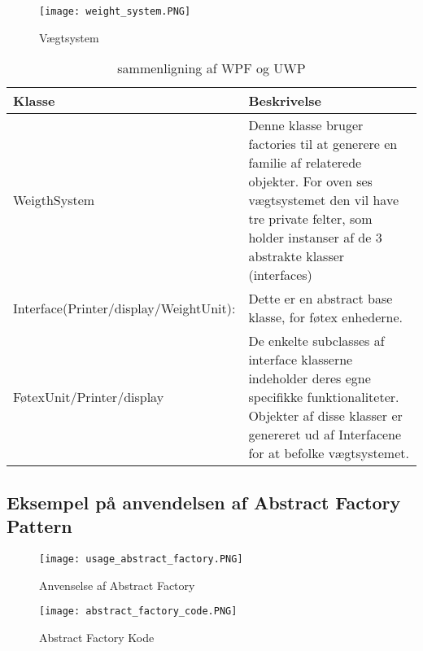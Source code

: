 \documentclass[../SWD_disp.tex]{subfiles}
\begin{document}
\begin{figure}[H]
    \centering
    \texttt{[image: weight\_system.PNG]}
    \caption{Vægtsystem}
    \label{fig:weight_system}
\end{figure}


\begin{table}[H]
    \centering
    \begin{tabular}{l|p{}}
        Klasse          & Beskrivelse        \\ \toprule
        WeigthSystem                & Denne klasse bruger factories til at generere en familie af relaterede objekter. For oven ses vægtsystemet den vil have tre private felter, som holder instanser af de 3 abstrakte klasser (interfaces)    \\ \midrule
        Interface(Printer/display/WeightUnit): & Dette er en abstract base klasse, for føtex enhederne.          \\ \midrule
        FøtexUnit/Printer/display    & De enkelte subclasses af interface klasserne indeholder deres egne specifikke funktionaliteter. Objekter af disse klasser er genereret ud af Interfacene for at befolke vægtsystemet. \\ \bottomrule
    \end{tabular}
    \caption{sammenligning af WPF og UWP}\label{tab:wpfVSuwp}
\end{table}

\subsection*{Eksempel på anvendelsen af Abstract Factory Pattern}
\begin{figure}[H]
    \centering
    \texttt{[image: usage\_abstract\_factory.PNG]}
    \caption{Anvenselse af Abstract Factory}
    \label{fig:usage_abstract_factory}
\end{figure}

\begin{figure}[H]
    \centering
    \texttt{[image: abstract\_factory\_code.PNG]}
    \caption{Abstract Factory Kode}
    \label{fig:abstract_factory_code}
\end{figure}
\end{document}
